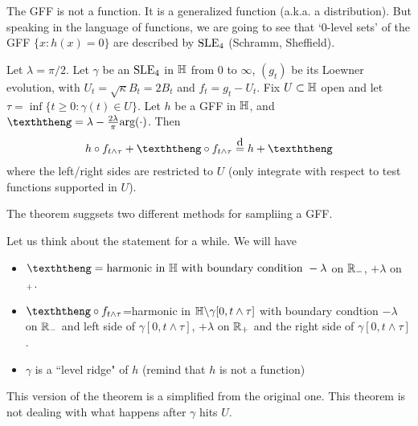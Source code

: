 \documentclass[12pt,a4paper]{article}
\newcommand\xeq{\stackrel{\mathclap{\normalfont\mbox{d}}}{=}}
\begin{document}
The GFF is not a function. It is a generalized function (a.k.a. a distribution). But speaking in the language of functions, we are going to see that `0-level sets' of the GFF $\{x: h(x) =0\}$ are described by $\text{SLE}_{4}$ (Schramm, Sheffield).
\s

\thm Let $\lambda = \pi/2$. Let $\gamma$ be an $\text{SLE}_{4}$ in $\mathbb{H}$ from $0$ to $\infty$, $(g_t)$ be its Loewner evolution, with $U_t =\sqrt{\kappa} B_t = 2B_t$ and $f_t = g_t - U_t$. Fix $U\subset \mathbb{H}$ open and let $\tau =\inf \{ t\geq 0 : \gamma(t) \in U \}$. Let $h$ be a GFF in $\mathbb{H}$, and $\hh = \lambda - \frac{2\lambda}{\pi} \text{arg}(\cdot)$. Then
\begin{align*}
h\circ f_{t\wedge \tau} + \hh \circ f_{t\wedge \tau} \xeq h + \hh
\end{align*}
where the left/right sides are restricted to $U$ (only integrate with respect to test functions supported in $U$).
\s

The theorem suggsets two different methods for sampliing a GFF.

\quad Let us think about the statement for a while. We will have
\begin{itemize}
\item $\hh = \text{harmonic in } \H\text{ with boundary condition }-\lambda$ on $\mathbb{R}_-$, $+\lambda$ on $\real_+$.
\item $\hh \circ f_{t\wedge \tau}$=harmonic in $\mathbb{H} \backslash \gamma[0, t\wedge \tau]$ with boundary condtion $-\lambda$  on $\mathbb{R}_-$ and left side of $\gamma[0, t\wedge \tau]$, $+ \lambda$ on $\mathbb{R}_+$ and the right side of $\gamma[0, t\wedge \tau]$.
\item $\gamma$ is a ``level ridge" of $h$ (remind that $h$ is not a function)
\end{itemize}
This version of the theorem is a simplified from the original one. This theorem is not dealing with what happens after $\gamma$ hits $U$.
\s
\end{document}
